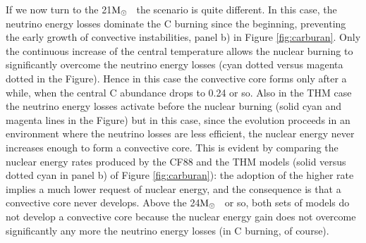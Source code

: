 \documentclass{aastex631}
\newcommand{\msun}{$\rm M_\odot$}
\begin{document}
If we now turn to the 21\msun~ the scenario is quite different. In this case, the neutrino energy losses dominate the C burning since the beginning, preventing the early growth of convective instabilities, panel b) in Figure \ref{fig:carburan}. Only the continuous increase of the central temperature allows the nuclear burning to significantly overcome the neutrino energy losses (cyan dotted versus magenta dotted in the Figure). Hence in this case the convective core forms only after a while, when the central C abundance drops to 0.24 or so. Also in the THM case the neutrino energy losses activate before the nuclear burning (solid cyan and magenta lines in the Figure) but in this case, since the evolution proceeds in an environment where the neutrino losses are less efficient, the nuclear energy never increases enough to form a convective core. This is evident by comparing the nuclear energy rates produced by the CF88 and the THM models (solid versus dotted cyan in panel b) of Figure \ref{fig:carburan}): the adoption of the higher rate implies a much lower request of nuclear energy, and the consequence is that a convective core never develops. Above the 24\msun~ or so, both sets of models do not develop a convective core because the nuclear energy gain does not overcome significantly any more the neutrino energy losses (in C burning, of course).
\end{document}

